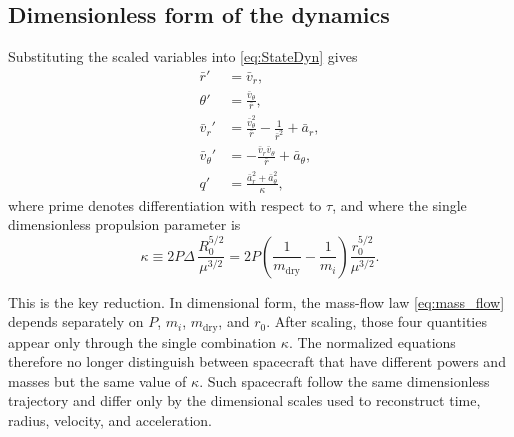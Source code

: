 \documentclass[journal,a4paper]{IEEEtran}
\begin{document}
\subsection{Dimensionless form of the dynamics}
Substituting the scaled variables into \eqref{eq:StateDyn} gives
\begin{subequations}\label{eq:StateDyn_scaled}
\begin{align}
  \bar r' &= \bar v_r, \\
  \theta' &= \frac{\bar v_\theta}{\bar r}, \\
  \bar v_r' &= \frac{\bar v_\theta^2}{\bar r} - \frac{1}{\bar r^2} + \bar a_r, \\
  \bar v_\theta' &= -\frac{\bar v_r\bar v_\theta}{\bar r} + \bar a_\theta, \\
  q' &= \frac{\bar a_r^2+\bar a_\theta^2}{\kappa},
\end{align}
\end{subequations}
where prime denotes differentiation with respect to \(\tau\), and where the single dimensionless propulsion parameter is
\begin{equation}
  \kappa \equiv 2P\Delta\,\frac{R_0^{5/2}}{\mu^{3/2}}
  = 2P\left(\frac{1}{m_\mathrm{dry}}-\frac{1}{m_i}\right)\frac{r_0^{5/2}}{\mu^{3/2}}.
  \label{eq:kappa_def}
\end{equation}

This is the key reduction.
In dimensional form, the mass-flow law \eqref{eq:mass_flow} depends separately on \(P\), \(m_i\), \(m_\mathrm{dry}\), and \(r_0\).
After scaling, those four quantities appear only through the single combination \(\kappa\).
The normalized equations therefore no longer distinguish between spacecraft that have different powers and masses but the same value of \(\kappa\).
Such spacecraft follow the same dimensionless trajectory and differ only by the dimensional scales used to reconstruct time, radius, velocity, and acceleration.
\end{document}

